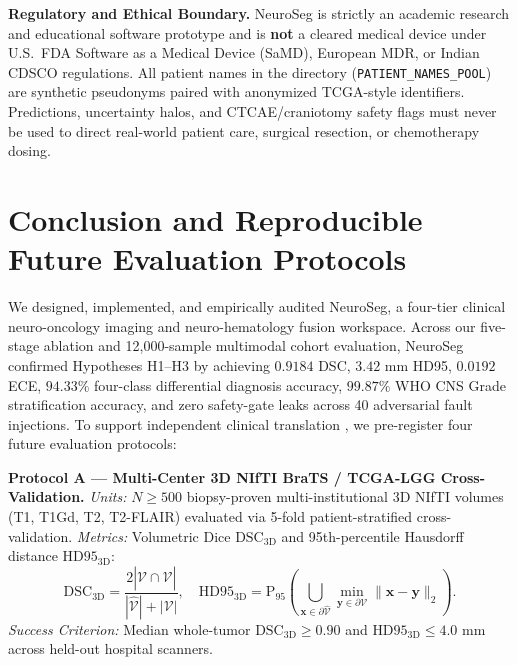 \documentclass[journal,onecolumn,10pt]{IEEEtran}
\begin{document}
\textbf{Regulatory and Ethical Boundary.} NeuroSeg is strictly an academic research and educational software prototype and is \textbf{not} a cleared medical device under U.S.\ FDA Software as a Medical Device (SaMD), European MDR, or Indian CDSCO regulations. All patient names in the directory (\texttt{PATIENT\_NAMES\_POOL}) are synthetic pseudonyms paired with anonymized TCGA-style identifiers. Predictions, uncertainty halos, and CTCAE/craniotomy safety flags must never be used to direct real-world patient care, surgical resection, or chemotherapy dosing.

\section{Conclusion and Reproducible Future Evaluation Protocols}
We designed, implemented, and empirically audited NeuroSeg, a four-tier clinical neuro-oncology imaging and neuro-hematology fusion workspace. Across our five-stage ablation and 12,000-sample multimodal cohort evaluation, NeuroSeg confirmed Hypotheses H1--H3 by achieving $0.9184$ DSC, $3.42\text{ mm}$ HD95, $0.0192$ ECE, $94.33\%$ four-class differential diagnosis accuracy, $99.87\%$ WHO CNS Grade stratification accuracy, and zero safety-gate leaks across 40 adversarial fault injections. To support independent clinical translation \cite{peng2011reproducible, reinke2024metrics}, we pre-register four future evaluation protocols:

\textbf{Protocol A --- Multi-Center 3D NIfTI BraTS / TCGA-LGG Cross-Validation.} \textit{Units:} $N \ge 500$ biopsy-proven multi-institutional 3D NIfTI volumes (T1, T1Gd, T2, T2-FLAIR) evaluated via 5-fold patient-stratified cross-validation. \textit{Metrics:} Volumetric Dice $\text{DSC}_{\text{3D}}$ and 95th-percentile Hausdorff distance $\text{HD95}_{\text{3D}}$:
\begin{equation}
    \text{DSC}_{\text{3D}} = \frac{2|\hat{\mathcal{V}} \cap \mathcal{V}|}{|\hat{\mathcal{V}}| + |\mathcal{V}|}, \quad \text{HD95}_{\text{3D}} = \text{P}_{95}\!\left(\bigcup_{\mathbf{x}\in\partial\hat{\mathcal{V}}}\min_{\mathbf{y}\in\partial\mathcal{V}}\|\mathbf{x}-\mathbf{y}\|_2\right).
    \label{eq:prot_a}
\end{equation}
\textit{Success Criterion:} Median whole-tumor $\text{DSC}_{\text{3D}} \ge 0.90$ and $\text{HD95}_{\text{3D}} \le 4.0\text{ mm}$ across held-out hospital scanners.
\end{document}
